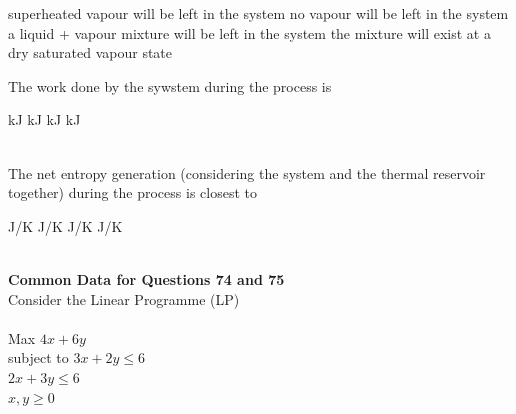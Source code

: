 \documentclass[addpoints,11pt]{exam}
\begin{document}
\begin{questions}
    \begin{choices}
        \choice superheated vapour will be left in the system
        \choice no vapour will be left in the system
        \choice a liquid + vapour mixture will be left in the system
        \choice the mixture will exist at a dry saturated vapour state
    \end{choices}

    \question The work done by the sywstem during the process is\\

    \begin{oneparchoices}
         kJ
         kJ
         kJ
         kJ
    \end{oneparchoices}\\

    \question The net entropy generation (considering the system and the thermal reservoir together) during the process is closest to\\

    \begin{oneparchoices}
         J/K
         J/K
         J/K
         J/K
    \end{oneparchoices}\\

\pagebreak
\normalsize\textbf{Common Data for Questions 74 and 75}\\
Consider the Linear Programme (LP)\\\\
Max $4x + 6y$\\
subject to
$3x+2y\le6$\\
$2x+3y\le6$\\
$x,y\ge0$


\end{questions}
\end{document}
